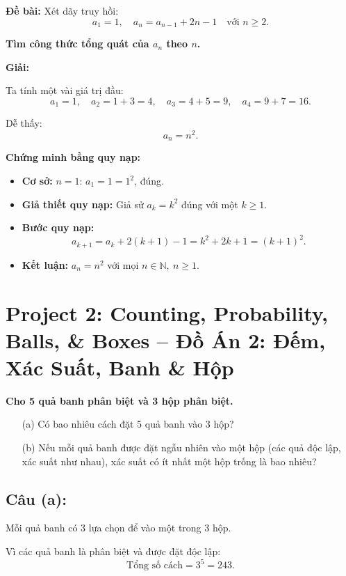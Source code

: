 \documentclass{article}
\begin{document}
	\textbf{Đề bài:} Xét dãy truy hồi:
	\[
	a_1 = 1,\quad a_n = a_{n-1} + 2n - 1 \quad \text{với } n \ge 2.
	\]
	
	\textbf{Tìm công thức tổng quát của $a_n$ theo $n$.}
	
	\textbf{Giải:}
	
	Ta tính một vài giá trị đầu:
	\[
	a_1 = 1,\quad a_2 = 1 + 3 = 4,\quad a_3 = 4 + 5 = 9,\quad a_4 = 9 + 7 = 16.
	\]
	
	Dễ thấy:
	\[
	a_n = n^2.
	\]
	
	\textbf{Chứng minh bằng quy nạp:}
	
	\begin{itemize}[leftmargin=1.5cm]
		\item \textbf{Cơ sở:} $n = 1$: $a_1 = 1 = 1^2$, đúng.
		
		\item \textbf{Giả thiết quy nạp:} Giả sử $a_k = k^2$ đúng với một $k \ge 1$.
		
		\item \textbf{Bước quy nạp:}
		\[
		a_{k+1} = a_k + 2(k+1) - 1 = k^2 + 2k + 1 = (k+1)^2.
		\]
		
		\item \textbf{Kết luận:} $a_n = n^2$ với mọi $n \in \mathbb{N},\ n \ge 1$.
	\end{itemize}
	
	\section*{Project 2: Counting, Probability, Balls, \& Boxes -- Đồ Án 2: Đếm, Xác Suất, Banh \& Hộp}
	
	\textbf{Cho 5 quả banh phân biệt và 3 hộp phân biệt.}
	
	\begin{itemize}[leftmargin=1.5cm]
		\item[(a)] Có bao nhiêu cách đặt 5 quả banh vào 3 hộp?
		\item[(b)] Nếu mỗi quả banh được đặt ngẫu nhiên vào một hộp (các quả độc lập, xác suất như nhau), xác suất có ít nhất một hộp trống là bao nhiêu?
	\end{itemize}
	
	\subsection*{Câu (a):}
	Mỗi quả banh có 3 lựa chọn để vào một trong 3 hộp.
	
	Vì các quả banh là phân biệt và được đặt độc lập:
	\[
	\text{Tổng số cách} = 3^5 = 243.
	\]
	
\end{document}
